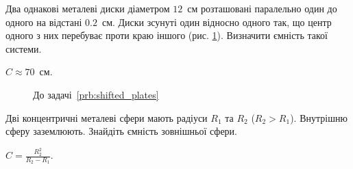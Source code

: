 \begin{problem}\label{prb:shifted_plates}
Два однакові металеві диски діаметром $12$~см розташовані паралельно один до одного на відстані $0.2$~см. Диски зсунуті один відносно одного так, що центр одного з них  перебуває проти краю іншого (рис. \ref{shifted_plates}). Визначити ємність такої системи.
\begin{solution}
	$C \approx 70$~см.
\end{solution}
\end{problem}
\begin{figure}[h!]\centering
	\caption{До задачі~\ref{prb:shifted_plates}}
	\label{shifted_plates}
\end{figure}

%
%

\begin{problem}
    Дві концентричні металеві сфери мають радіуси $R_1$ та $R_2$ ($ R_2  > R_1 $). Внутрішню сферу заземлюють. Знайдіть ємність зовнішньої сфери.
\begin{solution}
	$C = \frac{R_2^2}{R_2 - R_1}$.
\end{solution}
\end{problem}

